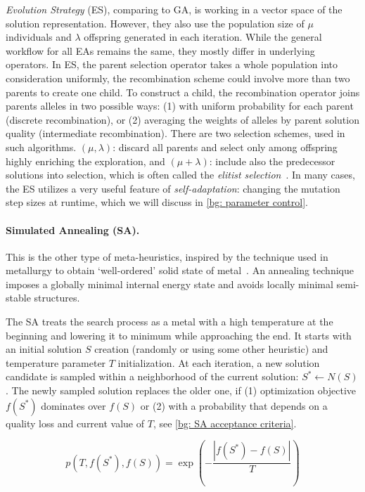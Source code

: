 \emph{Evolution Strategy} (ES), comparing to GA, is working in a vector space of the solution representation. However, they also use the population size of $\mu$ individuals and $\lambda$ offspring generated in each iteration. While the general workflow for all EAs remains the same, they mostly differ in underlying operators. In ES, the parent selection operator takes a whole population into consideration uniformly, the recombination scheme could involve more than two parents to create one child. To construct a child, the recombination operator joins parents alleles in two possible ways: (1) with uniform probability for each parent (discrete recombination), or (2) averaging the weights of alleles by parent solution quality (intermediate recombination). There are two selection schemes, used in such algorithms. $(\mu,\lambda)$: discard all parents and select only among offspring highly enriching the exploration, and $(\mu+\lambda)$: include also the predecessor solutions into selection, which is often called the \textit{elitist selection}~\cite{eiben2015popular}. In many cases, the ES utilizes a very useful feature of \emph{self-adaptation}: changing the mutation step sizes at runtime, which we will discuss in \cref{bg: parameter control}.

\paragraph{Simulated Annealing (SA).} This is the other type of meta-heuristics, inspired by the technique used in metallurgy to obtain `well-ordered' solid state of metal~\cite{van1987simulated}. An annealing technique imposes a globally minimal internal energy state and avoids locally minimal semi-stable structures. 

The SA treats the search process as a metal with a high temperature at the beginning and lowering it to minimum while approaching the end. %
It starts with an initial solution $S$ creation (randomly or using some other heuristic) and temperature parameter $T$ initialization. At each iteration, a new solution candidate is sampled within a neighborhood of the current solution: $S^* \leftarrow N(S)$. The newly sampled solution replaces the older one, if (1) optimization objective $f(S^*)$ dominates over $f(S)$ or (2) with a probability that depends on a quality loss and current value of $T$, see \cref{bg: SA acceptance criteria}.

\begin{equation}
p(T, f(S^*), f(S)) = \exp(-\frac{|f(S^*) - f(S)|}{T})
\label{bg: SA acceptance criteria}
\end{equation}

